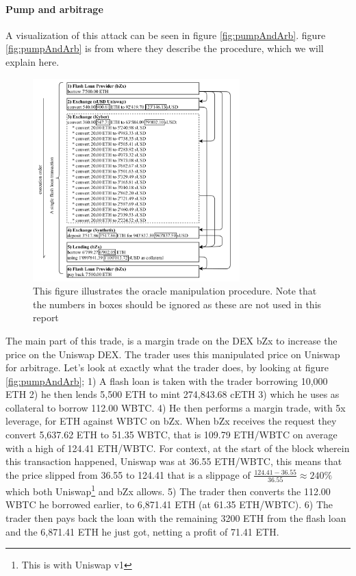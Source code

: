 \paragraph{Pump and arbitrage} A visualization of this attack can be
seen in figure \ref{fig:pumpAndArb}. figure \ref{fig:pumpAndArb} is
from \cite{attack} where they describe the procedure, which we will
explain here.
\begin{figure}
  \centering
  \includegraphics[width=8cm]{assests/oracle}
  \caption{This figure illustrates the oracle manipulation
    procedure. Note that the numbers in boxes should be ignored as
    these are not used in this report \cite[p. 6 fig. 7]{attack}}
  \label{fig:oracle}
\end{figure}
The main part of this trade, is a margin trade on the DEX bZx to
increase the price on the Uniswap DEX. The trader uses this
manipulated price on Uniswap for arbitrage. Let's look at exactly what
the trader does, by looking at figure \ref{fig:pumpAndArb}; 1) A flash
loan is taken with the trader borrowing 10,000 ETH 2) he then lends
5,500 ETH to mint 274,843.68 cETH 3) which he uses as collateral to
borrow 112.00 WBTC. 4) He then performs a margin trade, with 5x
leverage, for ETH against WBTC on bZx. When bZx receives the request
they convert 5,637.62 ETH to 51.35 WBTC, that is 109.79 ETH/WBTC on
average with a high of 124.41 ETH/WBTC. For context, at the start of
the block wherein this transaction happened, Uniswap was at 36.55 ETH/WBTC,
this means that the price slipped from 36.55 to 124.41 that is a
slippage of $\frac{124.41-36.55}{36.55}\approx 240\%$ which both
Uniswap\footnote{This is with Uniswap v1} and bZx allows. 5) The
trader then converts the 112.00 WBTC he borrowed earlier, to 6,871.41
ETH (at 61.35 ETH/WBTC). 6) The trader then pays back the loan with
the remaining 3200 ETH from the flash loan and the 6,871.41 ETH he
just got, netting a profit of 71.41 ETH.


